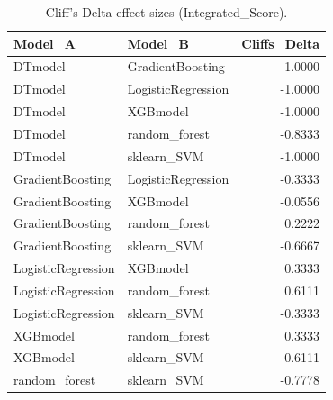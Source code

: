 \begin{table}[t]
\centering
\begin{tabular}{llr}
\toprule
Model_A & Model_B & Cliffs_Delta \\
\midrule
DTmodel & GradientBoosting & -1.0000 \\
DTmodel & LogisticRegression & -1.0000 \\
DTmodel & XGBmodel & -1.0000 \\
DTmodel & random_forest & -0.8333 \\
DTmodel & sklearn_SVM & -1.0000 \\
GradientBoosting & LogisticRegression & -0.3333 \\
GradientBoosting & XGBmodel & -0.0556 \\
GradientBoosting & random_forest & 0.2222 \\
GradientBoosting & sklearn_SVM & -0.6667 \\
LogisticRegression & XGBmodel & 0.3333 \\
LogisticRegression & random_forest & 0.6111 \\
LogisticRegression & sklearn_SVM & -0.3333 \\
XGBmodel & random_forest & 0.3333 \\
XGBmodel & sklearn_SVM & -0.6111 \\
random_forest & sklearn_SVM & -0.7778 \\
\bottomrule
\end{tabular}
\caption{Cliff's Delta effect sizes (Integrated_Score).}
\label{tab:cliffs_Integrated_Score}
\end{table}
